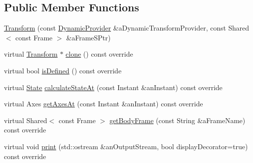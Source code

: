 \subsection*{Public Member Functions}
\begin{DoxyCompactItemize}
\item 
\hyperlink{classostk_1_1astro_1_1flight_1_1profile_1_1models_1_1_transform_a95d76db47af0764c1a05c32298799d72}{Transform} (const \hyperlink{namespaceostk_1_1astro_1_1flight_1_1profile_1_1models_a7e9732cb31adb5d5c1f85f7bad1f3424}{Dynamic\+Provider} \&a\+Dynamic\+Transform\+Provider, const Shared$<$ const Frame $>$ \&a\+Frame\+S\+Ptr)
\item 
virtual \hyperlink{classostk_1_1astro_1_1flight_1_1profile_1_1models_1_1_transform}{Transform} $\ast$ \hyperlink{classostk_1_1astro_1_1flight_1_1profile_1_1models_1_1_transform_aafd4791dacf320ddedddefbc8d0f2e0e}{clone} () const override
\item 
virtual bool \hyperlink{classostk_1_1astro_1_1flight_1_1profile_1_1models_1_1_transform_a2d0f1f3cc3f340c5617125bea08a9930}{is\+Defined} () const override
\item 
virtual \hyperlink{classostk_1_1astro_1_1flight_1_1profile_1_1_state}{State} \hyperlink{classostk_1_1astro_1_1flight_1_1profile_1_1models_1_1_transform_a6288febae942c92508173db08b4554b0}{calculate\+State\+At} (const Instant \&an\+Instant) const override
\item 
virtual Axes \hyperlink{classostk_1_1astro_1_1flight_1_1profile_1_1models_1_1_transform_a7eb8b58fd5f72e8ee9aa3b94cd0ffaaa}{get\+Axes\+At} (const Instant \&an\+Instant) const override
\item 
virtual Shared$<$ const Frame $>$ \hyperlink{classostk_1_1astro_1_1flight_1_1profile_1_1models_1_1_transform_a7fa6ee57c59b5bff2c60001c11cac04c}{get\+Body\+Frame} (const String \&a\+Frame\+Name) const override
\item 
virtual void \hyperlink{classostk_1_1astro_1_1flight_1_1profile_1_1models_1_1_transform_aef9a20156493d68570a989d87ac2f9f6}{print} (std\+::ostream \&an\+Output\+Stream, bool display\+Decorator=true) const override
\end{DoxyCompactItemize}
